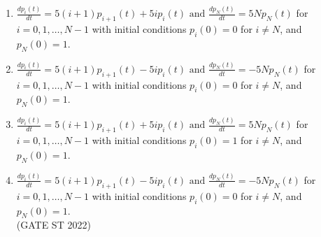 \documentclass[journal,12pt,onecolumn]{IEEEtran}
\theoremstyle{remark}
\begin{document}
 \begin{enumerate}[label=\alph*.] 
	\item $ \frac{dp_i(t)}{dt} = 5(i + 1)p_{i+1}(t) + 5i p_i(t) \text{ and } \frac{dp_N(t)}{dt} = 5Np_N(t)$ for $i = 0,1, \dots ,N - 1$ with initial conditions $p_i(0) = 0$ for $i \neq N $, and $p_N(0) = 1$.\\
	\item $ \frac{dp_i(t)}{dt} = 5(i + 1)p_{i+1}(t) - 5i p_i(t) \text{ and } \frac{dp_N(t)}{dt} = -5Np_N(t)$ for $i = 0,1, \dots ,N - 1$ with initial conditions $p_i(0) = 0$ for $i \neq N $, and $p_N(0) = 1$.\\
	\item $ \frac{dp_i(t)}{dt} = 5(i + 1)p_{i+1}(t) + 5i p_i(t) \text{ and } \frac{dp_N(t)}{dt} = 5Np_N(t)$ for $i = 0,1, \dots ,N - 1$ with initial conditions $p_i(0) = 1$ for $i \neq N $, and $p_N(0) = 1$.\\
	\item $ \frac{dp_i(t)}{dt} = 5(i + 1)p_{i+1}(t) - 5i p_i(t) \text{ and } \frac{dp_N(t)}{dt} = -5Np_N(t)$ for $i = 0,1, \dots ,N - 1$ with initial conditions $p_i(0) = 0$ for $i \neq N $, and $p_N(0) = 1$.\\
	\hfill (GATE ST 2022)
\end{enumerate}
\end{document}
